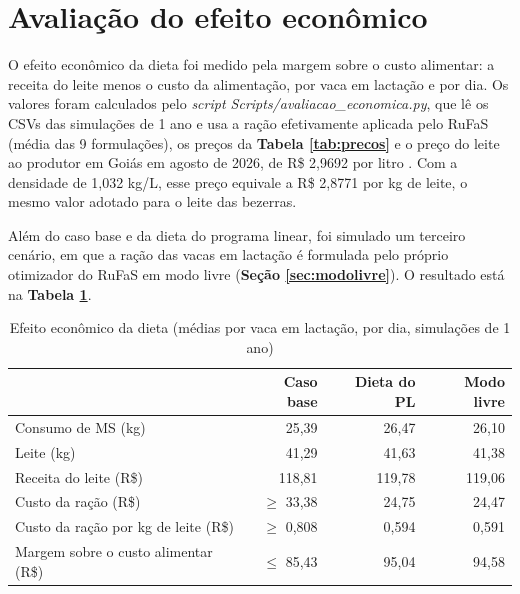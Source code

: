 \documentclass[a4paper,12pt]{article}
\begin{document}
\section{Avaliação do efeito econômico}\label{sec:economico}

O efeito econômico da dieta foi medido pela margem sobre o custo alimentar: a receita do leite menos o custo da alimentação, por vaca em lactação e por dia. Os valores foram calculados pelo \textit{script Scripts/\allowbreak avaliacao\_\allowbreak economica.py}, que lê os CSVs das simulações de 1 ano e usa a ração efetivamente aplicada pelo RuFaS (média das 9 formulações), os preços da \textbf{Tabela \ref{tab:precos}} e o preço do leite ao produtor em Goiás em agosto de 2026, de R\$ 2,9692 por litro \cite{website:cepealeite}. Com a densidade de 1,032 kg/L, esse preço equivale a R\$ 2,8771 por kg de leite, o mesmo valor adotado para o leite das bezerras.

Além do caso base e da dieta do programa linear, foi simulado um terceiro cenário, em que a ração das vacas em lactação é formulada pelo próprio otimizador do RuFaS em modo livre (\textbf{Seção \ref{sec:modolivre}}). O resultado está na \textbf{Tabela \ref{tab:economico}}.

\begin{table}[htbp]
    \centering
    \caption{Efeito econômico da dieta (médias por vaca em lactação, por dia, simulações de 1 ano)}
    \label{tab:economico}
    \begin{tabular}{lrrr}
        \toprule
        & \textbf{Caso base} & \textbf{Dieta do PL} & \textbf{Modo livre} \\
        \midrule
        \rowcolor{gray!15}
        Consumo de MS (kg) & 25,39 & 26,47 & 26,10 \\
        Leite (kg) & 41,29 & 41,63 & 41,38 \\
        \rowcolor{gray!15}
        Receita do leite (R\$) & 118,81 & 119,78 & 119,06 \\
        Custo da ração (R\$) & $\geq$ 33,38 & 24,75 & 24,47 \\
        \rowcolor{gray!15}
        Custo da ração por kg de leite (R\$) & $\geq$ 0,808 & 0,594 & 0,591 \\
        Margem sobre o custo alimentar (R\$) & $\leq$ 85,43 & 95,04 & 94,58 \\
        \bottomrule
    \end{tabular}
\end{table}
\end{document}
